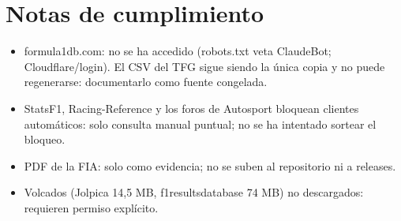 \section{Notas de cumplimiento}

\begin{itemize}
\item formula1db.com: no se ha accedido (robots.txt veta ClaudeBot; Cloudflare/login). El CSV del TFG sigue siendo la única copia y no puede regenerarse: documentarlo como fuente congelada.
\item StatsF1, Racing-Reference y los foros de Autosport bloquean clientes automáticos: solo consulta manual puntual; no se ha intentado sortear el bloqueo.
\item PDF de la FIA: solo como evidencia; no se suben al repositorio ni a releases.
\item Volcados (Jolpica 14,5 MB, f1resultsdatabase 74 MB) no descargados: requieren permiso explícito.
\end{itemize}
